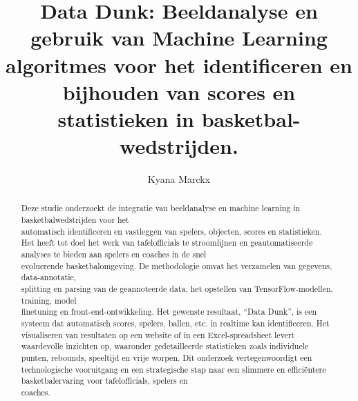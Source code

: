 \documentclass{hogent-article}
\title{Data Dunk: Beeldanalyse en gebruik van Machine Learning algoritmes voor het identificeren en \\bijhouden van scores en statistieken in basketbal-\\wedstrijden.}
\author{Kyana Marckx}
\begin{document}
\begin{abstract}
  
  Deze studie onderzoekt de integratie van beeldanalyse en machine learning in basketbalwedstrijden voor het \\automatisch identificeren en vastleggen van spelers, objecten, scores en statistieken. Het heeft tot doel het werk van tafelofficials te stroomlijnen en geautomatiseerde analyses te bieden aan spelers en coaches in de snel \\evoluerende basketbalomgeving. De methodologie omvat het verzamelen van gegevens, data-annotatie, \\splitting en parsing van de geannoteerde data, het opstellen van TensorFlow-modellen, training, model \\finetuning en front-end-ontwikkeling. Het gewenste resultaat, ``Data Dunk'', is een systeem dat  automatisch scores, spelers, ballen, etc. in realtime kan identificeren. Het visualiseren van resultaten op een website of in een Excel-spreadsheet levert waardevolle inzichten op, waaronder gedetailleerde statistieken zoals individuele \\punten, rebounds,  speeltijd en vrije worpen. Dit onderzoek vertegenwoordigt een technologische vooruitgang en een strategische stap naar een slimmere en efficiëntere basketbalervaring voor tafelofficials, spelers en \\coaches.
\end{abstract}

\tableofcontents




%
%
\printbibliography[heading=bibintoc]
\end{document}
